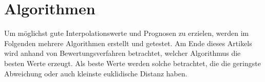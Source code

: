 
\section{Algorithmen}

Um möglichst gute Interpolationswerte und Prognosen zu erzielen, werden im Folgenden mehrere Algorithmen erstellt und getestet. Am Ende dieses Artikels wird anhand von Bewertungsverfahren betrachtet, welcher Algorithmus die besten Werte erzeugt. Als beste Werte werden solche betrachtet, die die geringste Abweichung oder auch kleinste euklidische Distanz haben. %